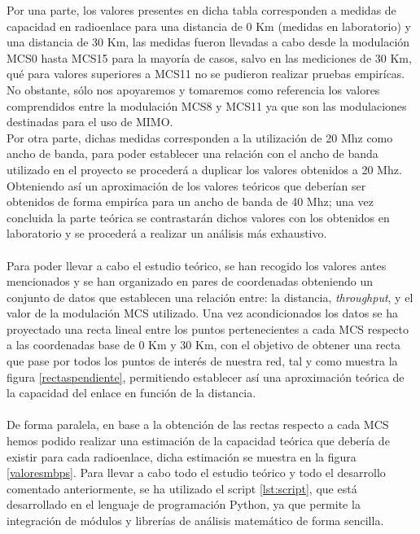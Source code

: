 	Por una parte, los valores presentes en dicha tabla corresponden a medidas de capacidad en radioenlace para una distancia de 0 Km (medidas en laboratorio) y una distancia de 30 Km, las medidas fueron llevadas a cabo desde la modulación MCS0 hasta MCS15 para la mayoría de casos, salvo en las mediciones de 30 Km, qué para valores superiores a MCS11 no se pudieron realizar pruebas empirícas. No obstante, sólo nos apoyaremos y tomaremos como referencia los valores comprendidos entre la modulación MCS8 y MCS11 ya que son las modulaciones destinadas para el uso de MIMO. \\
	Por otra parte, dichas medidas corresponden a la utilización de 20 Mhz como ancho de banda, para poder establecer una relación con el ancho de banda utilizado en el proyecto se procederá a duplicar los valores obtenidos a 20 Mhz. Obteniendo así un aproximación de los valores teóricos que deberían ser obtenidos de forma empiríca para un ancho de banda de 40 Mhz; una vez concluida la parte teórica se contrastarán dichos valores con los obtenidos en laboratorio y se procederá a realizar un análisis más exhaustivo.\\\\
	
	Para poder llevar a cabo el estudio teórico, se han recogido los valores antes mencionados y se han organizado en pares de coordenadas obteniendo un conjunto de datos que establecen una relación entre: la distancia, \textit{throughput}, y el valor de la modulación MCS utilizado. Una vez acondicionados los datos se ha proyectado una recta lineal entre los puntos pertenecientes a cada MCS respecto a las coordenadas base de 0 Km y 30 Km, con el objetivo de obtener una recta que pase por todos los puntos de interés de nuestra red, tal y como muestra la figura \ref{rectaspendiente}, permitiendo establecer así una aproximación teórica de la capacidad del enlace en función de la distancia.\\\\
	
	De forma paralela, en base a la obtención de las rectas respecto a cada MCS hemos podido realizar una estimación de la capacidad teórica que debería de existir para cada radioenlace, dicha estimación se muestra en la figura \ref{valoresmbps}. Para llevar a cabo todo el estudio teórico y todo el desarrollo comentado anteriormente, se ha utilizado el script \ref{lst:script}, que está desarrollado en el lenguaje de programación Python, ya que permite la integración de módulos y librerías de análisis matemático de forma sencilla.
	
